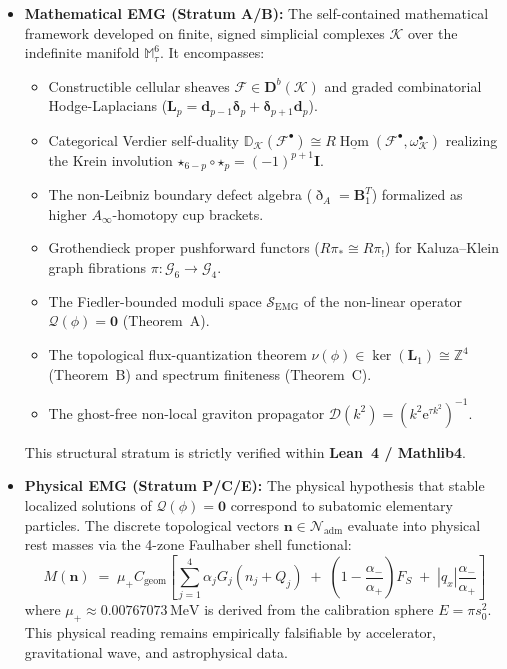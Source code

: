\documentclass[
    12pt,
    a4paper,
    headings=normal,
    twoside=false,
    open=any,
    parskip=half
]{scrbook}
\DeclareMathOperator{\Hom}{Hom}
\newcommand{\ethop}{\eth}
\newcommand{\eu}{\mathrm{e}}
\newcommand{\moduliS}{\mathscr{S}_{\text{EMG}}}
\newcommand{\spectrumN}{\mathcal{N}_{\text{adm}}}
\begin{document}
\begin{itemize}[leftmargin=1.8em, itemsep=6pt]
    \item \textbf{Mathematical EMG (Stratum A/B):} The self-contained mathematical framework developed on finite, signed simplicial complexes $\mathcal{K}$ over the indefinite manifold $\mathbb{M}_\tau^6$. It encompasses:
    \begin{itemize}[noitemsep, topsep=3pt]
        \item Constructible cellular sheaves $\mathscr{F} \in \mathbf{D}^b(\mathcal{K})$ and graded combinatorial Hodge-Laplacians ($\mathbf{L}_p = \mathbf{d}_{p-1}\boldsymbol{\delta}_p + \boldsymbol{\delta}_{p+1}\mathbf{d}_p$).
        \item Categorical Verdier self-duality $\mathbb{D}_\mathcal{K}(\mathscr{F}^\bullet) \cong R\underline{\Hom}(\mathscr{F}^\bullet, \omega_\mathcal{K}^\bullet)$ realizing the Krein involution $\boldsymbol{\star}_{6-p} \circ \boldsymbol{\star}_p = (-1)^{p+1}\mathbf{I}$.
        \item The non-Leibniz boundary defect algebra ($\ethop_A = \mathbf{B}_1^T$) formalized as higher $A_\infty$-homotopy cup brackets.
        \item Grothendieck proper pushforward functors ($R\pi_* \cong R\pi_!$) for Kaluza--Klein graph fibrations $\pi \colon \mathcal{G}_6 \to \mathcal{G}_4$.
        \item The Fiedler-bounded moduli space $\moduliS$ of the non-linear operator $\mathcal{Q}(\phi) = \mathbf{0}$ (Theorem~A).
        \item The topological flux-quantization theorem $\nu(\phi) \in \ker(\mathbf{L}_1) \cong \mathbb{Z}^4$ (Theorem~B) and spectrum finiteness (Theorem~C).
        \item The ghost-free non-local graviton propagator $\mathcal{D}(k^2) = (k^2 \eu^{\tau k^2})^{-1}$.
    \end{itemize}
    This structural stratum is strictly verified within \textbf{Lean~4 / Mathlib4}.

    \item \textbf{Physical EMG (Stratum P/C/E):} The physical hypothesis that stable localized solutions of $\mathcal{Q}(\phi) = \mathbf{0}$ correspond to subatomic elementary particles. The discrete topological vectors $\mathbf{n} \in \spectrumN$ evaluate into physical rest masses via the 4-zone Faulhaber shell functional:
    \begin{equation*}
    M(\mathbf{n}) \;=\; \mu_+ C_{\text{geom}} \left[ \sum_{j=1}^4 \alpha_j G_j\left(n_j + Q_j\right) \;+\; \left(1 - \frac{\alpha_-}{\alpha_+}\right)F_S \;+\; |q_x|\frac{\alpha_-}{\alpha_+} \right]
    \end{equation*}
    where $\mu_+ \approx 0.00767073\,\text{MeV}$ is derived from the calibration sphere $E = \pi s_0^2$. This physical reading remains empirically falsifiable by accelerator, gravitational wave, and astrophysical data.
\end{itemize}
\end{document}
